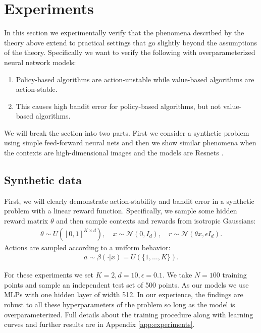 \section{Experiments}\label{sec:exp}

In this section we experimentally verify that the phenomena described by the theory above extend to practical settings that go slightly beyond the assumptions of the theory. Specifically we want to verify the following with overparameterized neural network models:
\begin{enumerate}
    \item Policy-based algorithms are action-unstable while value-based algorithms are action-stable.
    \item This causes high bandit error for policy-based algorithms, but not value-based algorithms.
\end{enumerate}

We will break the section into two parts. First we consider a synthetic problem using simple feed-forward neural nets and then we show similar phenomena when the contexts are high-dimensional images and the models are Resnets \cite{he2016deep}.

\subsection{Synthetic data}

First, we will clearly demonstrate action-stability and bandit error in a synthetic problem with a linear reward function.
Specifically, we sample some hidden reward matrix $ \theta$ and then sample contexts and rewards from isotropic Gaussians:
\begin{align*}
    \theta \sim U([0,1]^{K\times d}),\quad x \sim \mathcal{N}(0, I_d), \quad r \sim \mathcal{N}(\theta x, \epsilon I_d).
\end{align*}
Actions are sampled according to a uniform behavior:
\begin{align*}
    a\sim \beta(\cdot|x) = U(\{1,\dots,K\}).
\end{align*}

For these experiments we set $ K=2, d = 10, \epsilon = 0.1$. We take $ N = 100$ training points and sample an independent test set of 500 points. As our models we use MLPs with one hidden layer of width 512. In our experience, the findings are robust to all these hyperparameters of the problem so long as the model is overparameterized. Full details about the training procedure along with learning curves and further results are in Appendix \ref{app:experiments}.

